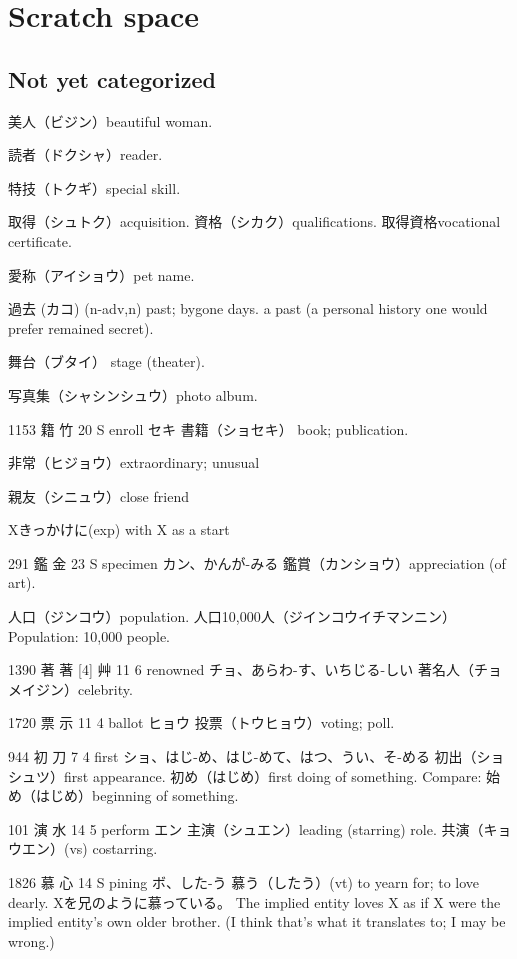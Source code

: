 \chapter{Scratch space}

\section{Not yet categorized}

美人（ビジン）beautiful woman.

読者（ドクシャ）reader.

特技（トクギ）special skill.

取得（シュトク）acquisition.
資格（シカク）qualifications.
取得資格vocational certificate.

愛称（アイショウ）pet name.

過去 (カコ) (n-adv,n)
past; bygone days.
a past (a personal history one would prefer remained secret).

舞台（ブタイ）
stage (theater).

写真集（シャシンシュウ）photo album.

1153	籍		竹	20	S		enroll	セキ
書籍（ショセキ）
book; publication.

非常（ヒジョウ）extraordinary; unusual

親友（シニュウ）close friend

Xきっかけに(exp) with X as a start

291	鑑		金	23	S		specimen	カン、かんが-みる
鑑賞（カンショウ）appreciation (of art).

人口（ジンコウ）population.
人口10,000人（ジインコウイチマンニン）
Population: 10,000 people.

1390	著	著 [4]	艸	11	6		renowned	チョ、あらわ-す、いちじる-しい
著名人（チョメイジン）celebrity.

1720	票		示	11	4		ballot	ヒョウ
投票（トウヒョウ）voting; poll.

944	初		刀	7	4		first	ショ、はじ-め、はじ-めて、はつ、うい、そ-める
初出（ショシュツ）first appearance.
初め（はじめ）first doing of something.
Compare: 始め（はじめ）beginning of something.

101	演		水	14	5		perform	エン
主演（シュエン）leading (starring) role.
共演（キョウエン）(vs) costarring.

1826	慕		心	14	S		pining	ボ、した-う
慕う（したう）(vt) to yearn for; to love dearly.
Xを兄のように慕っている。
The implied entity loves X as if
X were the implied entity's own older brother.
(I think that's what it translates to; I may be wrong.)

